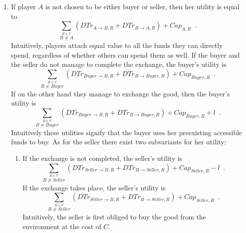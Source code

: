 \begin{enumerate}
    \item If player $A$ is not chosen to be either buyer or seller, then her utility is equal to 
    \begin{equation*}
      \sum\limits_{\overset{B \in \mathcal{V}}{B \neq A}}\left(DTr_{A \rightarrow B, R} + DTr_{B \rightarrow A, R}\right) +
      Cap_{A, R} \enspace.
    \end{equation*}
    Intuitively, players attach equal value to all the funds they can directly spend, regardless of whether others can spend
    them as well. If the buyer and the seller do not manage to complete the exchange, the buyer's utility is
    \begin{equation*}
      \sum\limits_{\overset{B \in \mathcal{V}}{B \neq Buyer}}\left(DTr_{Buyer \rightarrow B, R} + DTr_{B \rightarrow Buyer,
      R}\right) + Cap_{Buyer, R} \enspace.
    \end{equation*}
    If on the other hand they manage to exchange the good, then the buyer's utility is 
    \begin{equation*}
      \sum\limits_{\overset{B \in \mathcal{V}}{B \neq Buyer}}\left(DTr_{Buyer \rightarrow B, R} + DTr_{B \rightarrow Buyer,
      R}\right) + Cap_{Buyer, R} + l \enspace.
    \end{equation*}
    Intuitively these utilities signify that the buyer uses her preexisting accessible funds to buy. As for the seller there
    exist two subvariants for her utility:
    \begin{enumerate}
      \item If the exchange is not completed, the seller's utility is 
      \begin{equation*}
        \sum\limits_{\overset{B \in \mathcal{V}}{B \neq Seller}}\left(DTr_{Seller \rightarrow B, R} + DTr_{B \rightarrow
	Seller, R}\right) + Cap_{Seller, R} - l \enspace.
      \end{equation*}
      If the exchange takes place, the seller's utility is
      \begin{equation*}
        \sum\limits_{\overset{B \in \mathcal{V}}{B \neq Seller}}\left(DTr_{Seller \rightarrow B, R} + DTr_{B \rightarrow
	Seller, R}\right) + Cap_{Seller, R} \enspace.
      \end{equation*}
      Intuitively, the seller is first obliged to buy the good from the environment at the cost of $C$.


\end{enumerate}
\end{enumerate}
